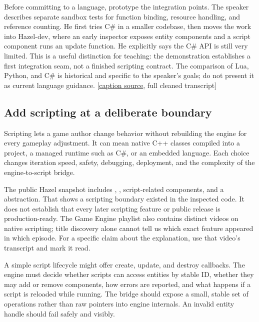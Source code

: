 Before committing to a language, prototype the integration points. The speaker describes separate sandbox tests for function binding, resource handling, and reference counting. He first tries C\# in a smaller codebase, then moves the work into Hazel-dev, where an early inspector exposes entity components and a script component runs an update function. He explicitly says the C\# API is still very limited. This is a useful distinction for teaching: the demonstration establishes a first integration seam, not a finished scripting contract. The comparison of Lua, Python, and C\# is historical and specific to the speaker's goals; do not present it as current language guidance. {[}\href{https://www.youtube.com/watch?v=ilqJfU3bUtM}{caption source}, full cleaned transcript{]}

\subsection{Add scripting at a deliberate boundary}\label{06-engine-ii-ch040-add-scripting-at-a-deliberate-boundary}

\hypertarget{06-engine-ii-ch040-add-scripting-at-a-deliberate-boundary}{}

Scripting lets a game author change behavior without rebuilding the engine for every gameplay adjustment. It can mean native C++ classes compiled into a project, a managed runtime such as C\#, or an embedded language. Each choice changes iteration speed, safety, debugging, deployment, and the complexity of the engine-to-script bridge.

The public Hazel snapshot includes , , script-related components, and a  abstraction. That shows a scripting boundary existed in the inspected code. It does not establish that every later scripting feature or public release is production-ready. The Game Engine playlist also contains distinct videos on native scripting; title discovery alone cannot tell us which exact feature appeared in which episode. For a specific claim about the explanation, use that video's transcript and mark it read.

A simple script lifecycle might offer create, update, and destroy callbacks. The engine must decide whether scripts can access entities by stable ID, whether they may add or remove components, how errors are reported, and what happens if a script is reloaded while running. The bridge should expose a small, stable set of operations rather than raw pointers into engine internals. An invalid entity handle should fail safely and visibly.

